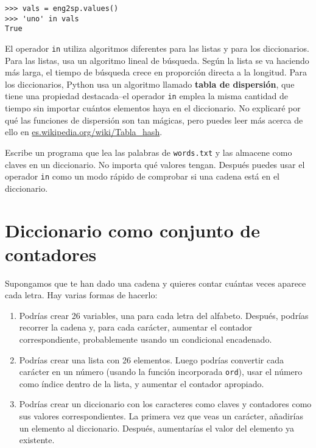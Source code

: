 
\beforeverb
\begin{verbatim}
>>> vals = eng2sp.values()
>>> 'uno' in vals
True
\end{verbatim}
\afterverb
%
El operador {\tt in} utiliza algoritmos diferentes para las listas y
para los diccionarios. Para las listas, usa un algoritmo lineal de búsqueda.
Según la lista se va haciendo más larga, el tiempo de búsqueda
crece en proporción directa a la longitud.
Para los diccionarios, Python usa un
algoritmo llamado {\bf tabla de dispersión}, que tiene una propiedad destacada--el
operador {\tt in} emplea la misma cantidad de tiempo sin importar cuántos
elementos haya en el diccionario. No explicaré
por qué las funciones de dispersión son tan mágicas,
pero puedes leer más acerca de ello en
\url{es.wikipedia.org/wiki/Tabla_hash}.


\begin{ex}
\label{wordlist2}


Escribe un programa que lea las palabras de {\tt words.txt} y
las almacene como claves en un diccionario. No importa qué
valores tengan. Después puedes usar el operador {\tt in}
como un modo rápido de comprobar si una cadena está en el
diccionario.

\end{ex}


\section{Diccionario como conjunto de contadores}
\label{histograma}


Supongamos que te han dado una cadena y quieres contar cuántas veces
aparece cada letra. Hay varias formas de hacerlo:

\begin{enumerate}

\item Podrías crear 26 variables, una para cada letra del
alfabeto. Después, podrías recorrer la cadena y, para cada
carácter, aumentar el contador correspondiente, probablemente
usando un condicional encadenado.

\item Podrías crear una lista con 26 elementos. Luego podrías
convertir cada carácter en un número (usando la función incorporada
{\tt ord}), usar el número como índice dentro de la lista, y aumentar
el contador apropiado.

\item Podrías crear un diccionario con los caracteres como claves
y contadores como sus valores correspondientes. La primera vez
que veas un carácter, añadirías un elemento al diccionario.
Después, aumentarías el valor del elemento ya existente.

\end{enumerate}

